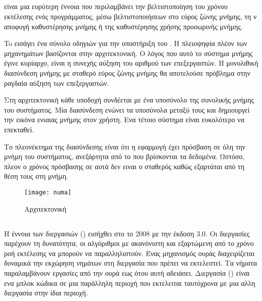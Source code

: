 \clearpage
\subsection{}
\subparagraph{}
\emph{} είναι μια ευρύτερη έννοια που περιλαμβάνει την βελτιστοποίηση του χρόνου εκτέλεσης ενός προγράμματος, μέσω βελτιστοποιήσεων στο εύρος ζώνης μνήμης, τη ν αποφυγή καθυστέρησης μνήμης ή της  καθυστέρησης χρήσης προσωρινής μνήμης.

To \emph{} εισάγει ένα σύνολο οδηγιών για την υποστήριξη του \emph{}\cite{thread_affinity}. Η πλειοψηφία πλέον των μηχανημάτων βασίζονται στην \emph{} αρχιτεκτονική. Ο λόγος που αυτό το σύστημα μνήμης έγινε κυρίαρχο, είναι η συνεχής αύξηση του αριθμού των επεξεργαστών. Η μονολιθική διασύνδεση μνήμης με σταθερό εύρος ζώνης μνήμης θα αποτελούσε πρόβλημα στην ραγδαία αύξηση των επεξεργαστών.

Στη \emph{} αρχιτεκτονική κάθε υποδοχή συνδέεται με ένα υποσύνολο της συνολικής μνήμης του συστήματος. Μία διασύνδεση ενώνει τα υποσύνολα μεταξύ τους και δημιουργεί την εικόνα ενιαιας μνήμης στον χρήστη. Ενα τέτοιο σύστημα είναι ευκολότερο να επεκταθεί.

Το πλεονέκτημα της διασύνδεσης είναι ότι η εφαρμογή έχει πρόσβαση σε όλη την μνήμη του συστήματος, ανεξάρτητα από το που βρίσκονται τα δεδομένα. Ωστόσο, πλεον ο χρόνος πρόσβασης σε αυτά δεν ειναι ο σταθερός καθώς εξαρτάται από τη θέση τους στη μνήμη.


\begin{figure}[h]
\texttt{[image: numa]}
\centering
\captionsetup{justification=centering, singlelinecheck=false}
	\caption{Αρχιτεκτονική \cite{thenextstep152}}
\label{fig:numa}
\end{figure}



\subsection{}
\subparagraph{}
Η έννοια των διεργασιών (\emph{}) εισήχθει στο  το 2008 με την έκδοση 3.0\cite{parallel_dist}.
Οι διεργασίες παρέχουν τη δυνατότητα, οι αλγόριθμοι με ακανόνιστη και εξαρτώμενη από το χρόνο ροή εκτέλεσης να μπορούν να παραλληλιστούν. Ένας μηχανισμός ουράς διαχειρίζεται δυναμικά την εκχώρηση νημάτων στη διεργασία που πρέπει να εκτελεστεί. Τα νήματα παραλαμβάνουν εργασίες από την ουρά εως ότου αυτή αδειάσει.
Διεργασία (\emph{}) είναι ενα μπλοκ κώδικα σε μια παράλληλη περιοχή που εκτελειται ταυτόχρονα με μια αλλη διεργασία στην ίδια περιοχή. 

